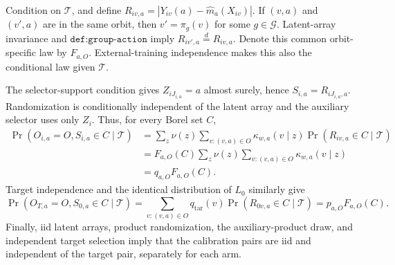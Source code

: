 Condition on \(\mathcal T\), and define \(R_{iv,a}=|Y_{iv}(a)-\widehat m_a(X_{iv})|\). If \((v,a)\) and \((v',a)\) are in the same orbit, then \(v'=\pi_g(v)\) for some \(g\in\mathcal G\). Latent-array invariance and \(\texttt{def:group-action}\) imply \(R_{iv',a}\overset d=R_{iv,a}\). Denote this common orbit-specific law by \(F_{a,O}\). External-training independence makes this also the conditional law given \(\mathcal T\).

The selector-support condition gives \(Z_{iJ_{i,a}}=a\) almost surely, hence \(S_{i,a}=R_{iJ_{i,a},a}\). Randomization is conditionally independent of the latent array and the auxiliary selector uses only \(Z_i\). Thus, for every Borel set \(C\), \[\begin{aligned}\Pr(O_{i,a}=O,S_{i,a}\in C\mid\mathcal T)&=\sum_z\nu(z)\sum_{v:(v,a)\in O}\kappa_{w,a}(v\mid z)\Pr(R_{iv,a}\in C\mid\mathcal T)\\&=F_{a,O}(C)\sum_z\nu(z)\sum_{v:(v,a)\in O}\kappa_{w,a}(v\mid z)\\&=q_{a,O}F_{a,O}(C).\end{aligned}\] Target independence and the identical distribution of \(L_0\) similarly give \[\Pr(O_{T,a}=O,S_{0,a}\in C\mid\mathcal T)=\sum_{v:(v,a)\in O}q_{\mathrm{tar}}(v)\Pr(R_{0v,a}\in C\mid\mathcal T)=p_{a,O}F_{a,O}(C).\] Finally, iid latent arrays, product randomization, the auxiliary-product draw, and independent target selection imply that the calibration pairs are iid and independent of the target pair, separately for each arm.